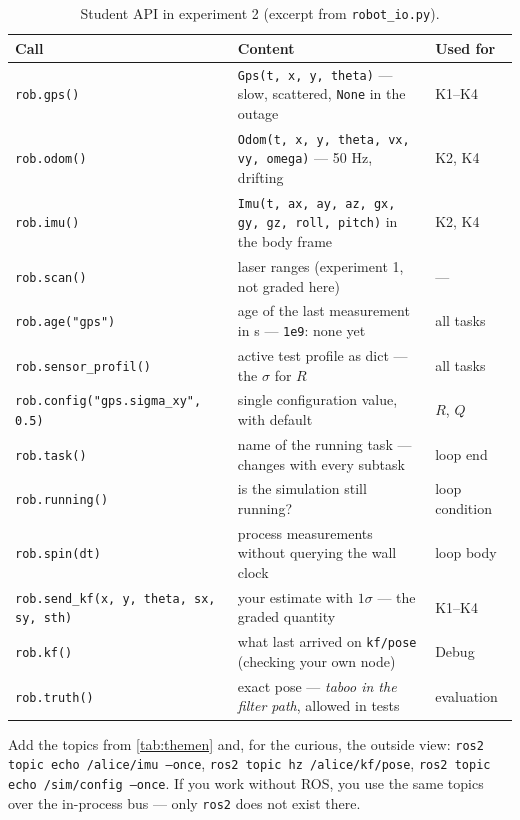 \documentclass[12pt,a4paper]{scrartcl}
\newcommand{\thema}[1]{\texttt{#1}}
\newcommand{\ordner}[1]{\texttt{#1}}
\newcommand{\kommando}[1]{\texttt{#1}}
\begin{document}
\begin{table}[ht]\centering\small
\caption{Student API in experiment 2 (excerpt from \ordner{robot\_io.py}).}
\label{tab:api}
\begin{tabular}{@{}lp{6.0cm}p{3.4cm}@{}}
\toprule
Call & Content & Used for \\
\midrule
\kommando{rob.gps()} & \thema{Gps(t, x, y, theta)} — slow, scattered, \kommando{None} in the outage & K1--K4 \\
\kommando{rob.odom()} & \thema{Odom(t, x, y, theta, vx, vy, omega)} — 50 Hz, drifting & K2, K4 \\
\kommando{rob.imu()} & \thema{Imu(t, ax, ay, az, gx, gy, gz, roll, pitch)} in the body frame & K2, K4 \\
\kommando{rob.scan()} & laser ranges (experiment 1, not graded here) & — \\
\kommando{rob.age("gps")} & age of the last measurement in s — \kommando{1e9}: none yet & all tasks \\
\kommando{rob.sensor\_profil()} & active test profile as dict — the \(\sigma\) for \(R\) & all tasks \\
\kommando{rob.config("gps.sigma\_xy", 0.5)} & single configuration value, with default & \(R\), \(Q\) \\
\kommando{rob.task()} & name of the running task — changes with every subtask & loop end \\
\kommando{rob.running()} & is the simulation still running? & loop condition \\
\kommando{rob.spin(dt)} & process measurements without querying the wall clock & loop body \\
\kommando{rob.send\_kf(x, y, theta, sx, sy, sth)} & your estimate with \(1\sigma\) — the graded quantity & K1--K4 \\
\kommando{rob.kf()} & what last arrived on \thema{kf/pose} (checking your own node) & Debug \\
\kommando{rob.truth()} & exact pose — \emph{taboo in the filter path}, allowed in tests & evaluation \\
\bottomrule
\end{tabular}
\end{table}

Add the topics from \cref{tab:themen} and, for the curious, the outside view:
\kommando{ros2 topic echo /alice/imu --once}, \kommando{ros2 topic hz /alice/kf/pose},
\kommando{ros2 topic echo /sim/config --once}. If you work without ROS, you use the same
topics over the in-process bus — only \kommando{ros2} does not exist there.
\end{document}
